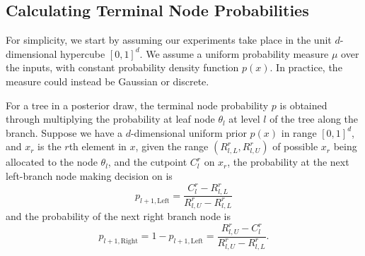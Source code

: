\subsection{Calculating Terminal Node Probabilities}
\label{p}

For simplicity, we start by assuming our experiments take place in the unit $d$-dimensional hypercube $[0,1]^d$. We assume a uniform probability measure $\mu$ over the inputs, with constant probability density function $p(x)$. In practice, the measure could instead be Gaussian or discrete. 

For a tree in a posterior draw, the terminal node probability $p$ is obtained through multiplying the probability at leaf node $\theta_{l}$ at level $l$ of the tree along the branch. Suppose we have a $d$-dimensional uniform prior $p(x)$ in range $[0,1]^d$, and $x_r$ is the $r$th element in $x$, given the range $(R_{l,L}^r, R_{l,U}^r)$ of possible $x_r$ being allocated to the node $\theta_l$, and the cutpoint $C_l^r$ on $x_r$, the probability at the next left-branch node making decision on is
\begin{equation}
\label{eq:p(x)}
    p_{l+1,\mbox{Left}} = \frac{C_l^r - R_{l,L}^r}{R_{l,U}^r - R_{l,L}^r}
\end{equation}
and the probability of the next right branch node is
\begin{equation}
    p_{l+1,\mbox{Right}} = 1-p_{l+1,\mbox{Left}} = \frac{R_{l,U}^r - C_l^r}{R_{l,U}^r - R_{l,L}^r}.
\end{equation}

